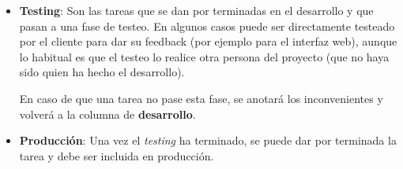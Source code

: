 \documentclass{\ClassPath/viu-tfm-template}
\begin{document}
\begin{minipage}{0.6\linewidth}
    \begin{itemize}

        \item \textbf{Testing}: Son las tareas que se dan por terminadas en el desarrollo y que pasan a una fase de testeo. En algunos casos puede ser directamente testeado por el cliente para dar su feedback (por ejemplo para el interfaz web), aunque lo habitual es que el testeo lo realice otra persona del proyecto (que no haya sido quien ha hecho el desarrollo).

        En caso de que una tarea no pase esta fase, se anotará los inconvenientes y volverá a la columna de \textbf{desarrollo}.
        \item \textbf{Producción}: Una vez el \textit{testing} ha terminado, se puede dar por terminada la tarea y debe ser incluida en producción.
    \end{itemize}
\end{minipage}
\hfill
\end{document}
